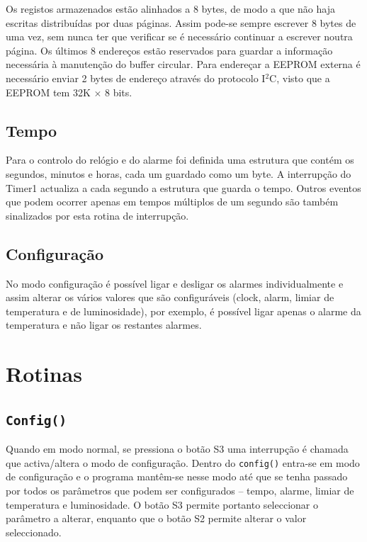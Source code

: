 \documentclass[a4paper,12pt]{article}
\begin{document}
Os registos armazenados estão alinhados a 8 bytes, de modo a que não haja escritas distribuídas por duas páginas. Assim pode-se sempre escrever 8 bytes de uma vez, sem nunca ter que verificar se é necessário continuar a escrever noutra página. Os últimos 8 endereços estão reservados para guardar a informação necessária à manutenção do buffer circular. Para endereçar a EEPROM externa é necessário enviar 2 bytes de endereço através do protocolo I$^2$C, visto que a EEPROM tem 32K $\times$ 8 bits.

\subsection{Tempo}

Para o controlo do relógio e do alarme foi definida uma estrutura que contém os segundos, minutos e horas, cada um guardado como um byte. A interrupção do Timer1 actualiza a cada segundo a estrutura que guarda o tempo. Outros eventos que podem ocorrer apenas em tempos múltiplos de um segundo são também sinalizados por esta rotina de interrupção.

\subsection{Configuração}

No modo configuração é possível ligar e desligar os alarmes individualmente e assim alterar os vários valores que são configuráveis (clock, alarm, limiar de temperatura e de luminosidade), por exemplo, é possível ligar apenas o alarme da temperatura e não ligar os restantes alarmes.


\section{Rotinas}

\subsection{\texttt{Config()}}

Quando em modo normal, se pressiona o botão S3 uma interrupção é chamada que activa/altera o modo de configuração. Dentro do \texttt{config()} entra-se em modo de configuração e o programa mantêm-se nesse modo até que se tenha passado por todos os parâmetros que podem ser configurados -- tempo, alarme, limiar de temperatura e luminosidade. O botão S3 permite portanto seleccionar o parâmetro a alterar, enquanto que o botão S2 permite alterar o valor seleccionado.
\end{document}
